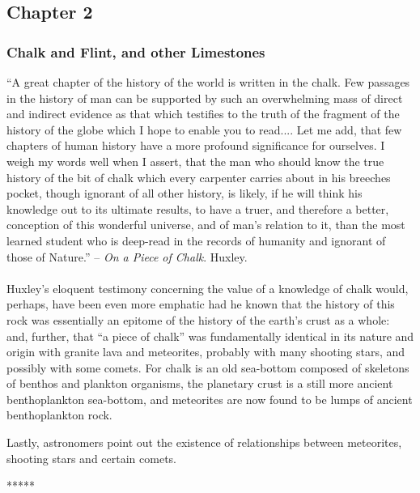 \documentclass[a4paper, 12pt, oneside]{article}
\begin{document}
\subsection{Chapter 2}
\subsubsection{Chalk and Flint, and other Limestones}
\begin{displayquote}
``A great chapter of the history of the world is written in the chalk. Few passages in the history of man can be supported by such an overwhelming mass of direct and indirect evidence as that which testifies to the truth of the fragment of the history of the globe which I hope to enable you to read.... Let me add, that few chapters of human history have a more profound significance for ourselves. I weigh my words well when I assert, that the man who should know the true history of the bit of chalk which every carpenter carries about in his breeches pocket, though ignorant of all other history, is likely, if he will think his knowledge out to its ultimate results, to have a truer, and therefore a better, conception of this wonderful universe, and of man's relation to it, than the most learned student who is deep-read in the records of humanity and ignorant of those of Nature.'' -- \emph{On a Piece of Chalk}. Huxley.
\end{displayquote}
\paragraph{}
Huxley's eloquent testimony concerning the value of a knowledge of chalk would, perhaps, have been even more emphatic had he known that the history of this rock was essentially an epitome of the history of the earth's crust as a whole: and, further, that ``a piece of chalk'' was fundamentally identical in its nature and origin with granite lava and meteorites, probably with many shooting stars, and possibly with some comets. For chalk is an old sea-bottom composed of skeletons of benthos and plankton organisms, the planetary crust is a still more ancient benthoplankton sea-bottom, and meteorites are now found to be lumps of ancient benthoplankton rock.

Lastly, astronomers point out the existence of relationships between meteorites, shooting stars and certain comets.

\centerline{*\hspace{15mm}*\hspace{15mm}*\hspace{15mm}*\hspace{15mm}*}
\bigskip
\end{document}
